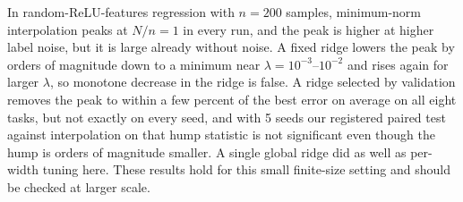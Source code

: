 In random-ReLU-features regression with $n=200$ samples, minimum-norm interpolation peaks at $N/n=1$ in every run, and the peak is higher at higher label noise, but it is large already without noise. A fixed ridge lowers the peak by orders of magnitude down to a minimum near $\lambda=10^{-3}$--$10^{-2}$ and rises again for larger $\lambda$, so monotone decrease in the ridge is false. A ridge selected by validation removes the peak to within a few percent of the best error on average on all eight tasks, but not exactly on every seed, and with 5 seeds our registered paired test against interpolation on that hump statistic is not significant even though the hump is orders of magnitude smaller. A single global ridge did as well as per-width tuning here. These results hold for this small finite-size setting and should be checked at larger scale.
